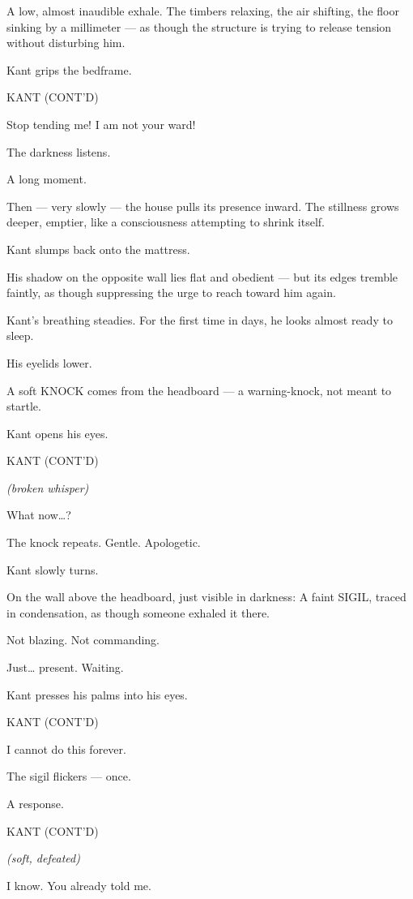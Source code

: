 \documentclass[12pt]{article}
\newenvironment{dialogue}[1]{%
  \vspace{0.8\baselineskip}%
  \noindent\hspace*{2.3in}\textsc{#1}\par%
  \noindent\hspace*{1.5in}\begin{minipage}[t]{4.5in}%
}{%
  \end{minipage}\par%
}
\newcommand{\paren}[1]{%
  \noindent\hspace*{1.8in}\textit{(#1)}\par%
}
\begin{document}
A low, almost inaudible exhale.
The timbers relaxing, the air shifting, the floor sinking by a millimeter —
as though the structure is trying to release tension without disturbing him.

Kant grips the bedframe.

\begin{dialogue}{KANT (CONT'D)}
Stop tending me!
I am not your ward!
\end{dialogue}

The darkness listens.

A long moment.

Then — very slowly — the house pulls its presence inward.
The stillness grows deeper, emptier,
like a consciousness attempting to shrink itself.

Kant slumps back onto the mattress.

His shadow on the opposite wall lies flat and obedient —
but its edges tremble faintly,
as though suppressing the urge to reach toward him again.

Kant’s breathing steadies.
For the first time in days, he looks almost ready to sleep.

His eyelids lower.

A soft KNOCK comes from the headboard —
a warning-knock, not meant to startle.

Kant opens his eyes.

\begin{dialogue}{KANT (CONT’D)}
\paren{broken whisper}
What now…?
\end{dialogue}

The knock repeats.
Gentle. Apologetic.

Kant slowly turns.

On the wall above the headboard, just visible in darkness:
A faint SIGIL, traced in condensation,
as though someone exhaled it there.

Not blazing.
Not commanding.

Just… present.
Waiting.

Kant presses his palms into his eyes.

\begin{dialogue}{KANT (CONT’D)}
I cannot do this forever.
\end{dialogue}

The sigil flickers —
once.

A response.

\begin{dialogue}{KANT (CONT’D)}
\paren{soft, defeated}
I know.
You already told me.
\end{dialogue}
\end{document}
